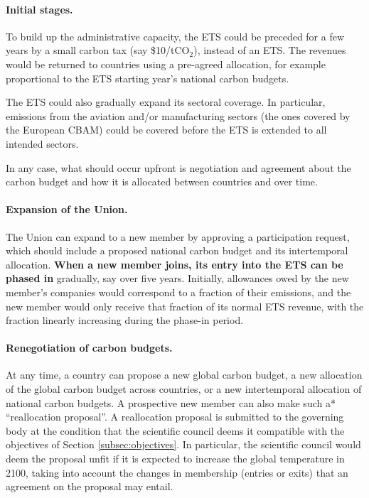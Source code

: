 \documentclass[12pt,english]{article}
\begin{document}
\paragraph{Initial stages.}

To build up the administrative capacity, the ETS could be preceded for a few years by a small carbon tax (say \$10/tCO$_\text{2}$), instead of an ETS. The revenues would be returned to countries using a pre-agreed allocation, for example proportional to the ETS starting year's national carbon budgets.

The ETS could also gradually expand its sectoral coverage. In particular, emissions from the aviation and/or manufacturing sectors (the ones covered by the European CBAM) could be covered before the ETS is extended to all intended sectors.

In any case, what should occur upfront is negotiation and agreement about the
carbon budget and how it is allocated between countries and over time.

\paragraph{Expansion of the Union.}
The Union can expand to a new member by approving a participation request, which should include a proposed national carbon budget and its intertemporal allocation. \textbf{When a new member joins, its entry into the ETS can be phased in} gradually, say over five years. Initially, allowances owed by the new member's companies would correspond to a fraction of their emissions, and the new member would only receive that fraction of its normal ETS revenue, with the fraction linearly increasing during the phase-in period. 

\paragraph{Renegotiation of carbon budgets.}
At any time, a country can propose a new global carbon budget, a new allocation of the global carbon budget across countries, or a new intertemporal allocation of national carbon budgets. A prospective new member can also make such a* ``reallocation proposal''. A reallocation proposal is submitted to the governing body at the condition that the scientific council deems it compatible with the objectives of Section \ref{subsec:objectives}. In particular, the scientific council would deem the proposal unfit if it is expected to increase the global temperature in 2100, taking into account the changes in membership (entries or exits) that an agreement on the proposal may entail.
\end{document}
